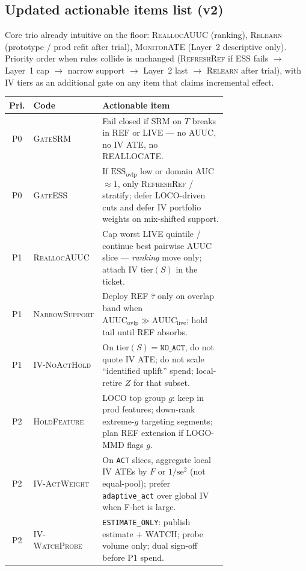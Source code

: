 \subsection{Updated actionable items list (v2)}
\label{sec:actionables-v2}

Core trio already intuitive on the floor: \textsc{ReallocAUUC} (ranking),
\textsc{Relearn} (prototype / prod refit after trial),
\textsc{MonitorATE} (Layer~2 descriptive only).
Priority order when rules collide is unchanged
(\textsc{RefreshRef} if ESS fails $\to$ Layer~1 cap $\to$ narrow support
$\to$ Layer~2 last $\to$ \textsc{Relearn} after trial), with IV tiers as an
additional gate on any item that claims incremental effect.

\begin{center}
\small
\begin{tabular}{@{}clp{0.72\linewidth}@{}}
\toprule
Pri. & Code & Actionable item \\
\midrule
P0 & \textsc{GateSRM} &
Fail closed if SRM on $T$ breaks in REF or LIVE --- no AUUC, no IV ATE, no REALLOCATE. \\
P0 & \textsc{GateESS} &
If $\mathrm{ESS}_{\mathrm{ovlp}}$ low or domain AUC$\approx 1$, only \textsc{RefreshRef} / stratify; defer LOCO-driven cuts and defer IV portfolio weights on mix-shifted support. \\
P1 & \textsc{ReallocAUUC} &
Cap worst LIVE quintile / continue best pairwise AUUC slice --- \emph{ranking} move only; attach IV $\mathrm{tier}(S)$ in the ticket. \\
P1 & \textsc{NarrowSupport} &
Deploy REF $\hat\tau$ only on overlap band when $\mathrm{AUUC}_{\mathrm{ovlp}}\gg\mathrm{AUUC}_{\mathrm{live}}$; hold tail until REF absorbs. \\
P1 & \textsc{IV-NoActHold} &
On $\mathrm{tier}(S)=\texttt{NO\_ACT}$, do not quote IV ATE; do not scale ``identified uplift'' spend; local-retire $Z$ for that subset. \\
P2 & \textsc{HoldFeature} &
LOCO top group $g$: keep in prod features; down-rank extreme-$g$ targeting segments; plan REF extension if LOGO-MMD flags $g$. \\
P2 & \textsc{IV-ActWeight} &
On \texttt{ACT} slices, aggregate local IV ATEs by $F$ or $1/\mathrm{se}^2$ (not equal-pool); prefer \texttt{adaptive\_act} over global IV when F-het is large. \\
P2 & \textsc{IV-WatchProbe} &
\texttt{ESTIMATE\_ONLY}: publish estimate + WATCH; probe volume only; dual sign-off before P1 spend. \\

\end{tabular}
\end{center}
